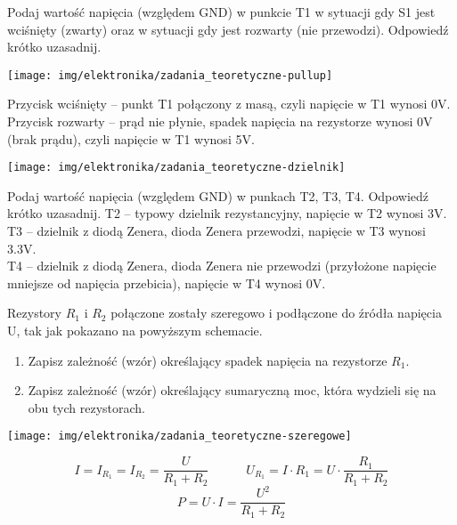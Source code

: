 \dbEntryCheckResults
\begin{minipage}[c]{0.64\textwidth}
	Podaj wartość napięcia (względem GND) w punkcie T1 w sytuacji gdy S1 jest wciśnięty (zwarty) oraz w sytuacji gdy jest rozwarty (nie przewodzi). Odpowiedź krótko uzasadnij.
\end{minipage}
\hfill
\begin{minipage}[c]{0.32\textwidth}
	\texttt{[image: img/elektronika/zadania\_teoretyczne-pullup]}
\end{minipage}
\fi
{}\dbEntryCheckResults
Przycisk wciśnięty – punkt T1 połączony z masą, czyli napięcie w T1 wynosi 0V.\\
Przycisk rozwarty – prąd nie płynie, spadek napięcia na rezystorze wynosi 0V (brak prądu), czyli napięcie w T1 wynosi 5V.
\fi

\dbEntryCheckResults
\begin{center} \texttt{[image: img/elektronika/zadania\_teoretyczne-dzielnik]}\vspace{-6mm} \end{center}
Podaj wartość napięcia (względem GND) w punkach T2, T3, T4. Odpowiedź krótko uzasadnij.
\fi
{}\dbEntryCheckResults
T2 – typowy dzielnik rezystancyjny, napięcie w T2 wynosi 3V.\\
T3 – dzielnik z diodą Zenera, dioda Zenera przewodzi, napięcie w T3 wynosi 3.3V.\\
T4 – dzielnik z diodą Zenera, dioda Zenera nie przewodzi (przyłożone napięcie mniejsze od napięcia przebicia), napięcie w T4 wynosi 0V.
\fi

\dbEntryCheckResults
\begin{minipage}[b]{0.64\textwidth}
  Rezystory $R_1$ i $R_2$ połączone zostały szeregowo i podłączone do źródła napięcia U, tak jak pokazano na powyższym schemacie.
  \begin{enumerate}[label=\alph*)]
    \item Zapisz zależność (wzór) określający spadek napięcia na rezystorze $R_1$.
    \item Zapisz zależność (wzór) określający sumaryczną moc, która wydzieli się na obu tych rezystorach.
  \end{enumerate}
\end{minipage}
\hfill
\begin{minipage}[b]{0.32\textwidth}
	\texttt{[image: img/elektronika/zadania\_teoretyczne-szeregowe]}
\end{minipage}
\fi
{}\dbEntryCheckResults
$$I = I_{R_1} = I_{R_2} = \frac{U}{R_1 + R_2}  \quad\qquad  U_{R_1} = I · R_1 = U · \frac{R_1}{R_1 + R_2}$$
$$P = U·I = \frac{U^2}{R_1 + R_2}$$
\fi

